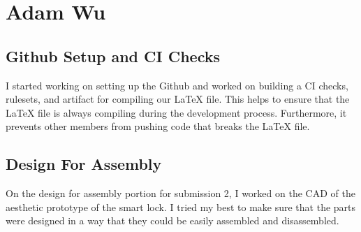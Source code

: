 \section{Adam Wu}

\subsection{Github Setup and CI Checks}
I started working on setting up the Github and worked on building a CI checks, rulesets, and artifact for compiling our LaTeX file. This helps to ensure that the LaTeX file is always compiling during the development process. Furthermore, it prevents other members from pushing code that breaks the LaTeX file. 

\subsection{Design For Assembly}
On the design for assembly portion for submission 2, I worked on the CAD of the aesthetic prototype of the smart lock. I tried my best to make sure that the parts were designed in a way that they could be easily assembled and disassembled.

